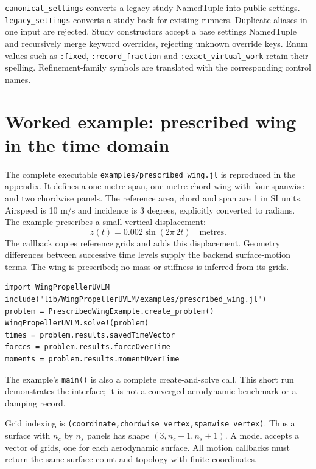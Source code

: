 \documentclass[11pt,a4paper]{article}
\newcommand{\code}{\nolinkurl}
\begin{document}
\code{canonical_settings} converts a legacy study NamedTuple into public
settings. \code{legacy_settings} converts a study back for existing runners.
Duplicate aliases in one input are rejected. Study constructors accept a
base settings NamedTuple and recursively merge keyword overrides, rejecting
unknown override keys. Enum values such as \code{:fixed}, \code{:record_fraction}
and \code{:exact_virtual_work} retain their spelling. Refinement-family symbols
are translated with the corresponding control names.

\section{Worked example: prescribed wing in the time domain}
\label{sec:wing}

The complete executable \code{examples/prescribed_wing.jl} is reproduced in
the appendix. It defines a one-metre-span, one-metre-chord wing with four
spanwise and two chordwise panels. The reference area, chord and span are
1 in SI units. Airspeed is 10 m/s and incidence is 3 degrees, explicitly
converted to radians. The example prescribes a small vertical displacement:
\begin{equation}
 z(t)=0.002\sin(2\pi\,2t)\quad\text{metres}.
\end{equation}
The callback copies reference grids and adds this displacement. Geometry
differences between successive time levels supply the backend surface-motion
terms. The wing is prescribed; no mass or stiffness is inferred from its grids.

\begin{lstlisting}
import WingPropellerUVLM
include("lib/WingPropellerUVLM/examples/prescribed_wing.jl")
problem = PrescribedWingExample.create_problem()
WingPropellerUVLM.solve!(problem)
times = problem.results.savedTimeVector
forces = problem.results.forceOverTime
moments = problem.results.momentOverTime
\end{lstlisting}
The example's \code{main()} is also a complete create-and-solve call.
This short run demonstrates the interface; it is not a converged aerodynamic
benchmark or a damping record.

Grid indexing is \code{(coordinate,chordwise vertex,spanwise vertex)}. Thus a
surface with $n_c$ by $n_s$ panels has shape $(3,n_c+1,n_s+1)$. A model accepts
a vector of grids, one for each aerodynamic surface. All motion callbacks must
return the same surface count and topology with finite coordinates.
\end{document}
